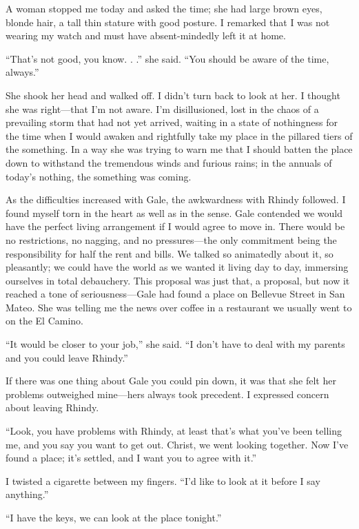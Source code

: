 A woman stopped me today and asked the time; she had large brown eyes,
blonde hair, a tall thin stature with good posture. I remarked that I
was not wearing my watch and must have absent-mindedly left it at home.

``That's not good, you know. . .'' she said. ``You should be aware of
the time, always.''

She shook her head and walked off. I didn't turn back to look at her. I
thought she was right---that I'm not aware. I'm disillusioned, lost in
the chaos of a prevailing storm that had not yet arrived, waiting in a
state of nothingness for the time when I would awaken and rightfully
take my place in the pillared tiers of the something. In a way she was
trying to warn me that I should batten the place down to withstand the
tremendous winds and furious rains; in the annuals of today's nothing,
the something was coming.

As the difficulties increased with Gale, the awkwardness with Rhindy
followed. I found myself torn in the heart as well as in the sense. Gale
contended we would have the perfect living arrangement if I would agree
to move in. There would be no restrictions, no nagging, and no
pressures---the only commitment being the responsibility for half the
rent and bills. We talked so animatedly about it, so pleasantly; we
could have the world as we wanted it living day to day, immersing
ourselves in total debauchery. This proposal was just that, a proposal,
but now it reached a tone of seriousness---Gale had found a place on
Bellevue Street in San Mateo. She was telling me the news over coffee in
a restaurant we usually went to on the El Camino.

``It would be closer to your job,'' she said. ``I don't have to deal
with my parents and you could leave Rhindy.''

If there was one thing about Gale you could pin down, it was that she
felt her problems outweighed mine---hers always took precedent. I
expressed concern about leaving Rhindy.

``Look, you have problems with Rhindy, at least that's what you've been
telling me, and you say you want to get out. Christ, we went looking
together. Now I've found a place; it's settled, and I want you to agree
with it.''

I twisted a cigarette between my fingers. ``I'd like to look at it
before I say anything.''

``I have the keys, we can look at the place tonight.''

